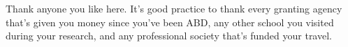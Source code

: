 \acknowledgements

Thank anyone you like here.  It's good practice to thank every granting agency that's given you money
since you've been ABD, any other school you visited during your research,
and any professional society that's funded your travel.
